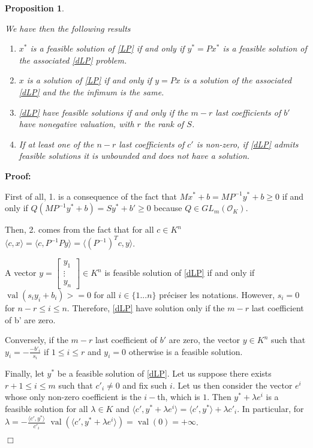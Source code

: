\documentclass[a4paper,12pt]{article}
\newenvironment{proof}{\hbox{}\vspace{-0.8cm} {\bf Proof:}}{\hfill $\Box$}
\newtheorem{proposition}{Proposition}
\newcommand{\corentin}[1]{{\color{red} #1}} %
\DeclareMathOperator{\val}{val}
\newcommand{\OK}{\mathcal{O}_K}
\begin{document}
\begin{proposition}\label{prop:reduc}
	
	We have then the following results
	\begin{enumerate}
		\item $x^*$ is a feasible solution of \ref{LP} if and only if $y^* = P x^*$ is a feasible solution of the associated \ref{dLP} problem.
		\item $x$ is a solution of \ref{LP} if and only if $y = P x$ is a solution of the associated \ref{dLP} and the the infimum is the same.
		\item \ref{dLP} have feasible solutions if and only if the $m-r$ last coefficients of $b'$ have nonegative valuation, with $r$ the rank of $S$.
		\item If at least one of the $n-r$ last coefficients of $c'$ is non-zero, if \ref{dLP} admits feasible solutions it is unbounded and does not have a solution.
		 
  \end{enumerate}
\end{proposition}
	
\begin{proof}

  First of all, 1. is a consequence of the fact that $Mx^*+b = MP^{-1}y^* +b\geq 0$ if and only if $Q(MP^{-1}y^* + b) = Sy^* + b' \geq 0$ because $Q \in GL_m(\OK)$.

  Then, 2. comes from the fact that for all $c \in K^n$ $\langle c, x\rangle = \langle c, P^{-1}Py \rangle = \langle \left(P^{-1}\right)^T c, y \rangle$.

  A vector $y =  \left[\begin{smallmatrix} y_1 \\ \vdots \\ y_n \end{smallmatrix}\right] \in K^n$ is feasible solution of \ref{dLP} if and only if $\val(s_i y_i + b_i) >=0$ for all $i \in \{1...n\}$ \corentin{préciser les notations}. 
  However, $s_i =0$ for $n-r \leq i\leq n$. Therefore, \ref{dLP} have solution only if the $m-r$ last coefficient of b' are zero.
  
  Conversely, if the $m-r$ last coefficient of $b'$ are zero, the vector $y \in K^n$ such that $y_i = -\frac{-b'_i}{s_i}$ if $1 \leq i \leq r$ and $y_i =0$ otherwise is a feasible solution.

  Finally, let $y^*$ be a feasible solution of \ref{dLP}. Let us suppose there exists $r+1 \leq i \leq m$ such that $c'_i \neq  0$ and fix such $i$. Let us then consider the vector $e^i$ whose only non-zero coefficient is the $i-$th, which is $1$. Then $y^*+\lambda e^i$ is a feasible solution for all $\lambda \in K$ and $\langle c', y^* + \lambda e^i\rangle = \langle c' , y^* \rangle + \lambda c'_i$. In particular, for $\lambda = -\frac{\langle c', y^* \rangle}{c'_i}$ $\val \left( \langle c', y^* + \lambda e ^i \rangle\right) = \val (0) = + \infty$. 

\end{proof}
\end{document}
